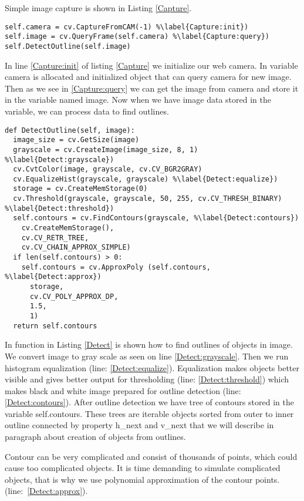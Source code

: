 \documentclass{ifacconf}
\begin{document}
Simple image capture is shown in Listing \ref{Capture}.
\begin{lstlisting}[caption=Query image frame from web camera, label=Capture]
self.camera = cv.CaptureFromCAM(-1) %\label{Capture:init})
self.image = cv.QueryFrame(self.camera) %\label{Capture:query})
self.DetectOutline(self.image)
\end{lstlisting}
In line \ref{Capture:init} of listing \ref{Capture} we initialize our web
camera. In variable camera is allocated and initialized object that can query
camera for new image. Then as we see in \ref{Capture:query} we can get the
image from camera and store it in the variable named image. Now when we have
image data stored in the variable, we can process data to find outlines.
\begin{lstlisting}[caption=Outline detection, label=Detect]
def DetectOutline(self, image):
  image_size = cv.GetSize(image)
  grayscale = cv.CreateImage(image_size, 8, 1)	%\label{Detect:grayscale})
  cv.CvtColor(image, grayscale, cv.CV_BGR2GRAY)
  cv.EqualizeHist(grayscale, grayscale)	%\label{Detect:equalize})
  storage = cv.CreateMemStorage(0)
  cv.Threshold(grayscale, grayscale, 50, 255, cv.CV_THRESH_BINARY) %\label{Detect:threshold})
  self.contours = cv.FindContours(grayscale, %\label{Detect:contours})
    cv.CreateMemStorage(),
    cv.CV_RETR_TREE,
    cv.CV_CHAIN_APPROX_SIMPLE)
  if len(self.contours) > 0:
    self.contours = cv.ApproxPoly (self.contours, %\label{Detect:approx})
      storage,
      cv.CV_POLY_APPROX_DP,
      1.5,
      1)
  return self.contours
\end{lstlisting}
In function in Listing \ref{Detect} is shown how to find outlines of objects in
image. We convert image to gray scale as seen on line \ref{Detect:grayscale}.
Then we run histogram equalization (line: \ref{Detect:equalize}).
Equalization makes objects better visible and gives better output for
thresholding (line: \ref{Detect:threshold}) which makes black and white image
prepared for outline detection (line: \ref{Detect:contours}).
After outline detection we have tree of contours stored in the variable
self.contours. These trees are iterable objects sorted from outer to inner
outline connected by property h\_next and v\_next that we will describe in
paragraph about creation of objects from outlines.

Contour can be very complicated and consist of thousands of points, which could
cause too complicated objects. It is time demanding to simulate complicated
objects, that is why we use polynomial approximation of the contour points.
(line:~\ref{Detect:approx}).
\end{document}
